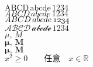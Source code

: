 \documentclass[UTF8]{ctexart}
\begin{document}
	$ \mathrm{ABCD\,abcde\, 1234} $ \\
	
	$ \mathit{ABCD\,abcde\, 1234} $ \\
	
	$ \mathnormal{ABCD\,abcde\, 1234} $ \\
	
	$ \mathcal{ABCD\,abcde\, 1234} $ \\
	
	$ \mu, \, M $ \\
	
	$ \boldsymbol{\mu}, \, \boldsymbol{M} $ \\
	
	$ \boldsymbol{\mu, \, M} $ \\
	
	$ x^2 \geq 0 \qquad \textrm{任意} \quad x \in \mathbb{R}$
	
\end{document}
